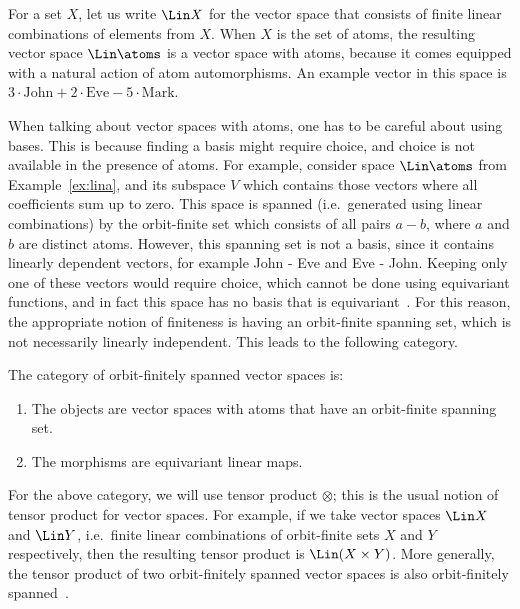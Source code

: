 \begin{example} \label{ex:lina} For a set $X$, let us write $\Lin X$ for the vector space that consists of finite linear combinations of elements from $X$. When $X$ is the set of atoms, the resulting vector space $\Lin \atoms$ is a vector space with atoms, because it comes equipped with a natural action of atom automorphisms.  An example vector in this space is $
3 \cdot \text{John} + 2 \cdot \text{Eve} - 5 \cdot \text{Mark}.
$ \exampleend
\end{example}

When talking about vector spaces with atoms, one has to be careful about using bases. This is because finding a basis might require choice, and choice is not available in the presence of atoms. 
For example, consider space $\Lin \atoms$ from Example~\ref{ex:lina}, and its subspace $V$ which contains those vectors where all coefficients sum up to zero. This space is spanned (i.e.~generated using linear combinations) by the orbit-finite set which consists of all pairs $a - b$, where $a$ and $b$ are distinct atoms.
However, this spanning set is not a basis, since it contains linearly dependent vectors, for example John - Eve and Eve - John. Keeping only one of these vectors would require choice, which cannot be done using equivariant functions, and in fact this space has no basis that is equivariant~\cite[Example 6]{bojanczykKM21OrbitFiniteVector}. For this reason, the appropriate notion of finiteness is having an orbit-finite spanning set, which is not necessarily linearly independent. This leads to the following category.

\begin{definition}\label{def:orbit-finite-vector-space-category}
    The category of orbit-finitely spanned vector spaces is:
    \begin{enumerate}
        \item The objects are vector spaces with atoms that have an orbit-finite spanning set.
        \item The morphisms are equivariant linear maps.
    \end{enumerate}
\end{definition}

For the above category, we will use tensor product $\otimes$; this is the usual notion of tensor product for vector spaces. For example, if we take vector spaces $\Lin X$ and $\Lin Y$, i.e.~finite linear combinations of orbit-finite sets $X$ and $Y$ respectively, then the resulting tensor product is $\Lin (X \times Y)$. More generally, the tensor product of two orbit-finitely spanned vector spaces is also orbit-finitely spanned~\cite[Theorem VI.3]{bojanczykKM21OrbitFiniteVector}. 

